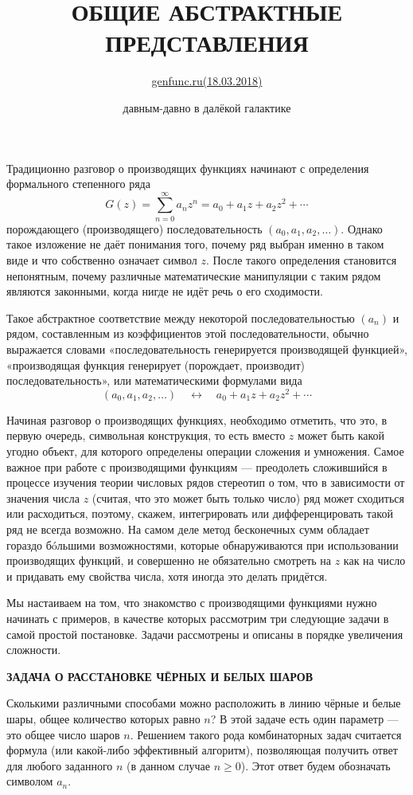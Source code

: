 \documentclass[12pt, letterpaper]{extarticle}
\title{\textbf{ОБЩИЕ АБСТРАКТНЫЕ ПРЕДСТАВЛЕНИЯ}}
\author{\href{https://web.archive.org/web/20170629072301/http://www.genfunc.ru/theory/intro/}{genfunc.ru(18.03.2018)}}
\date{давным-давно в далёкой галактике}
\begin{document}
\maketitle
Традиционно разговор о производящих функциях начинают с определения формального степенного ряда
\[G(z)=\sum_{n=0}^{\infty} a_nz^n = a_0 + a_1z + a_2z^2 + \cdots\]
порождающего (производящего) последовательность $(a_0, a_1, a_2, \dots)$. Однако такое изложение не даёт понимания того, почему ряд выбран именно в таком виде и что собственно означает символ $z$. После такого определения становится непонятным, почему различные математические манипуляции с таким рядом являются законными, когда нигде не идёт речь о его сходимости.

Такое абстрактное соответствие между некоторой последовательностью $(a_n)$ и рядом, составленным из коэффициентов этой последовательности, обычно выражается словами «последовательность генерируется производящей функцией», «производящая функция генерирует (порождает, производит) последовательность», или математическими формулами вида
\[(a_0,a_1,a_2,\ldots)\quad\leftrightarrow\quad a_0+a_1z+a_2z^2+\cdots\]

Начиная разговор о производящих функциях, необходимо отметить, что это, в первую очередь, символьная конструкция, то есть вместо $z$ может быть какой угодно объект, для которого определены операции сложения и умножения. Самое важное при работе с производящими функциям — преодолеть сложившийся в процессе изучения теории числовых рядов стереотип о том, что в зависимости от значения числа $z$ (считая, что это может быть только число) ряд может сходиться или расходиться, поэтому, скажем, интегрировать или дифференцировать такой ряд не всегда возможно. На самом деле метод бесконечных сумм обладает гораздо бóльшими возможностями, которые обнаруживаются при использовании производящих функций, и совершенно не обязательно смотреть на $z$ как на число и придавать ему свойства числа, хотя иногда это делать придётся.

Мы настаиваем на том, что знакомство с производящими функциями нужно начинать с примеров, в качестве которых рассмотрим три следующие задачи в самой простой постановке. Задачи рассмотрены и описаны в порядке увеличения сложности.

\begin{center}
  \textbf{ЗАДАЧА О РАССТАНОВКЕ ЧЁРНЫХ И БЕЛЫХ ШАРОВ}
\end{center}

Сколькими различными способами можно расположить в линию чёрные и белые шары, общее количество которых равно $n$? В этой задаче есть один параметр — это общее число шаров $n$. Решением такого рода комбинаторных задач считается формула (или какой-либо эффективный алгоритм), позволяющая получить ответ для любого заданного $n$ (в данном случае $n\geq0$). Этот ответ будем обозначать символом $a_n$.
\end{document}
